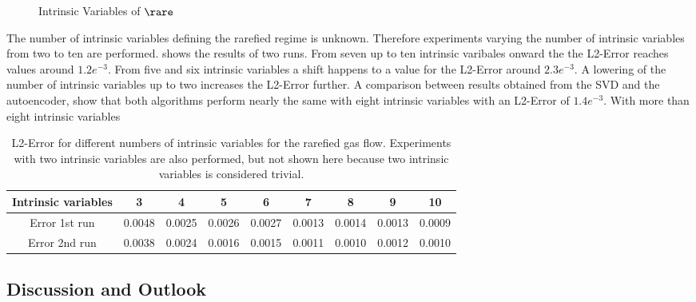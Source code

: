 \begin{figure}[!hp]
	\scalebox{0.9}{}
	\caption{Intrinsic Variables of $\rare$}
\end{figure}
The number of intrinsic variables defining the rarefied regime is unknown. Therefore experiments varying the number of intrinsic variables from two to ten are performed.  shows the results of two runs. From seven up to ten intrinsic varibales onward the the L2-Error reaches values around \(1.2e^{-3}\). From five and six intrinsic variables a shift happens to a value for the L2-Error around \(2.3e^{-3}\). A lowering of the number of intrinsic variables up to two increases the L2-Error further. A comparison between results obtained from the SVD and the autoencoder, show that both algorithms perform nearly the same with eight intrinsic variables with an L2-Error of \(1.4e^{-3}\). With more than eight intrinsic variables  
\begin{table}[!htbp]\centering
	\begin{tabular}{ |c|c|c|c|c|c|c|c|c| }
		\hline
		Intrinsic variables  & 3 & 4 & 5 & 6 & 7 & 8 & 9 & 10 \\ [.5ex]
		\hline
		Error 1st run & 0.0048 & 0.0025 & 0.0026 & 0.0027 & 0.0013 & 0.0014 & 0.0013 & 0.0009\\ \hline
		Error 2nd run & 0.0038 & 0.0024 & 0.0016 & 0.0015 & 0.0011 & 0.0010 & 0.0012 & 0.0010\\\hline
	\end{tabular}
	\caption{L2-Error for different numbers of intrinsic variables for the rarefied gas flow. Experiments with two intrinsic variables are also performed, but not shown here because two intrinsic variables is considered trivial.}
	\label{Tab:Intrinsic units}
\end{table}
\subsection{Discussion and Outlook}
